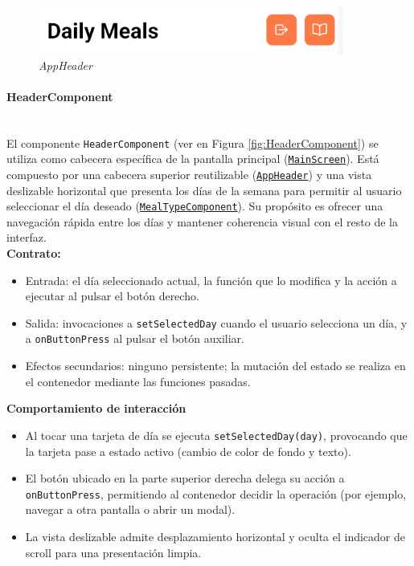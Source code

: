 \documentclass[twoside, openright, 11pt]{report}
\begin{document}
					\begin{figure}[H]
						\centering
						\includegraphics{imagenes/AppHeader}
						\caption{\textit{AppHeader}}
						\label{fig:AppHeader}
					\end{figure}
					
					
					\paragraph{HeaderComponent\\\\}
					\label{HeaderComponent}
					
					El componente \texttt{HeaderComponent} (ver en Figura \ref{fig:HeaderComponent}) se utiliza como cabecera específica de la pantalla principal (\hyperref[MainScreen]{\texttt{MainScreen}}). Está compuesto por una cabecera superior reutilizable (\texttt{\hyperref[AppHeader]{AppHeader}}) y una vista deslizable horizontal que presenta los días de la semana para permitir al usuario seleccionar el día deseado (\texttt{\hyperref[MealTypeComponent]{MealTypeComponent}}). Su propósito es ofrecer una navegación rápida entre los días y mantener coherencia visual con el resto de la interfaz.\\
					
					\textbf{Contrato:\\}
					\begin{itemize}
						\item Entrada: el día seleccionado actual, la función que lo modifica y la acción a ejecutar al pulsar el botón derecho.
						\item Salida: invocaciones a \texttt{setSelectedDay} cuando el usuario selecciona un día, y a \texttt{onButtonPress} al pulsar el botón auxiliar.
						\item Efectos secundarios: ninguno persistente; la mutación del estado se realiza en el contenedor mediante las funciones pasadas.
					\end{itemize}
					
					\textbf{Comportamiento de interacción\\}
					\begin{itemize}
						\item Al tocar una tarjeta de día se ejecuta \texttt{setSelectedDay(day)}, provocando que la tarjeta pase a estado activo (cambio de color de fondo y texto).
						\item El botón ubicado en la parte superior derecha delega su acción a \texttt{onButtonPress}, permitiendo al contenedor decidir la operación (por ejemplo, navegar a otra pantalla o abrir un modal).
						\item La vista deslizable admite desplazamiento horizontal y oculta el indicador de scroll para una presentación limpia.
					\end{itemize}
					
\end{document}

